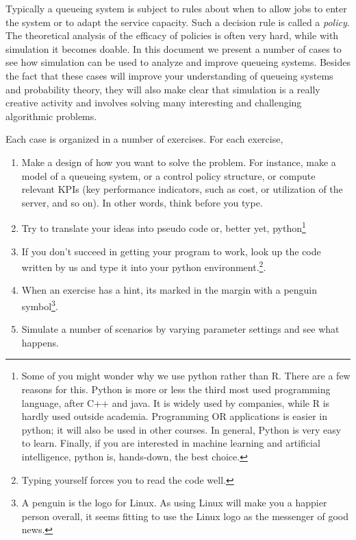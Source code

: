 Typically a queueing system is subject to rules about when to allow jobs to enter the system or to adapt the service capacity.
Such a decision rule is called a \emph{policy}.
The theoretical analysis of the efficacy of policies is often very hard, while with simulation it becomes doable.
In this document we present a number of cases to see how simulation can be used to analyze and improve queueing systems.
Besides the fact that these cases will improve your understanding of queueing systems and probability theory, they will also make clear that simulation is a really creative activity and involves solving many interesting and challenging algorithmic problems.


Each case is organized in a number of exercises.
For each exercise,
\begin{enumerate}
\item Make a design of how you want to solve the problem.
  For instance, make a model of a queueing system, or a control policy structure, or compute relevant KPIs (key performance indicators, such as cost, or utilization of the server, and so on).
  In other words, think before you type.
\item Try to translate your ideas into pseudo code or, better yet, python\footnote{Some of you might wonder why we use python rather than R.
    There are a few reasons for this.
    Python is more or less the third most used programming language, after C++ and java.
    It is widely used by companies, while R is hardly used outside academia.
    Programming OR applications is easier in python; it will also be used in other courses.
    In general, Python is very easy to learn.
    Finally, if you are interested in machine learning and artificial intelligence, python is, hands-down, the best choice.}
  \item If you don't succeed in getting your program to work,  look up the code written by us and type it into your python environment.\footnote{Typing yourself forces you to read the code well.}.
  \item When an exercise has a hint, its marked in the margin with a penguin symbol\footnote{A penguin is the logo for Linux.
      As using Linux will make you a happier person overall, it seems fitting to use the Linux logo as the messenger of good news.}.
    
  \item Simulate a number of scenarios by varying parameter settings and see what happens.
\end{enumerate}

